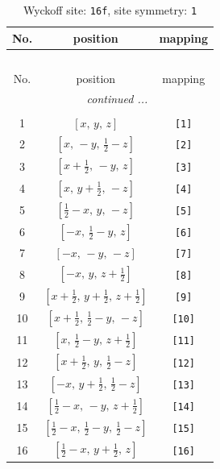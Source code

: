 \documentclass[fleqn,8pt]{jsarticle}
\begin{document}
\begin{longtable}{ccc}
\caption{Wyckoff site: {\tt 16f}, site symmetry: {\tt 1}}
 \\
 \hline \hline
No. & position & mapping \\ \hline \endfirsthead

\multicolumn{2}{l}{\tablename\ \thetable{}} \\
 \hline \hline
No. & position & mapping \\ \hline \endhead

 \hline \hline
\multicolumn{2}{r}{\footnotesize\it continued ...} \\ \endfoot

 \hline \hline
\multicolumn{2}{r}{} \\ \endlastfoot

1 & $\left[ x,\, y,\, z \right]$ & {\tt [1]} \\ \hline
2 & $\left[ x,\, - y,\, \frac{1}{2} - z \right]$ & {\tt [2]} \\ \hline
3 & $\left[ x + \frac{1}{2},\, - y,\, z \right]$ & {\tt [3]} \\ \hline
4 & $\left[ x,\, y + \frac{1}{2},\, - z \right]$ & {\tt [4]} \\ \hline
5 & $\left[ \frac{1}{2} - x,\, y,\, - z \right]$ & {\tt [5]} \\ \hline
6 & $\left[ - x,\, \frac{1}{2} - y,\, z \right]$ & {\tt [6]} \\ \hline
7 & $\left[ - x,\, - y,\, - z \right]$ & {\tt [7]} \\ \hline
8 & $\left[ - x,\, y,\, z + \frac{1}{2} \right]$ & {\tt [8]} \\ \hline
9 & $\left[ x + \frac{1}{2},\, y + \frac{1}{2},\, z + \frac{1}{2} \right]$ & {\tt [9]} \\ \hline
10 & $\left[ x + \frac{1}{2},\, \frac{1}{2} - y,\, - z \right]$ & {\tt [10]} \\ \hline
11 & $\left[ x,\, \frac{1}{2} - y,\, z + \frac{1}{2} \right]$ & {\tt [11]} \\ \hline
12 & $\left[ x + \frac{1}{2},\, y,\, \frac{1}{2} - z \right]$ & {\tt [12]} \\ \hline
13 & $\left[ - x,\, y + \frac{1}{2},\, \frac{1}{2} - z \right]$ & {\tt [13]} \\ \hline
14 & $\left[ \frac{1}{2} - x,\, - y,\, z + \frac{1}{2} \right]$ & {\tt [14]} \\ \hline
15 & $\left[ \frac{1}{2} - x,\, \frac{1}{2} - y,\, \frac{1}{2} - z \right]$ & {\tt [15]} \\ \hline
16 & $\left[ \frac{1}{2} - x,\, y + \frac{1}{2},\, z \right]$ & {\tt [16]} \\
\end{longtable}
\end{document}
